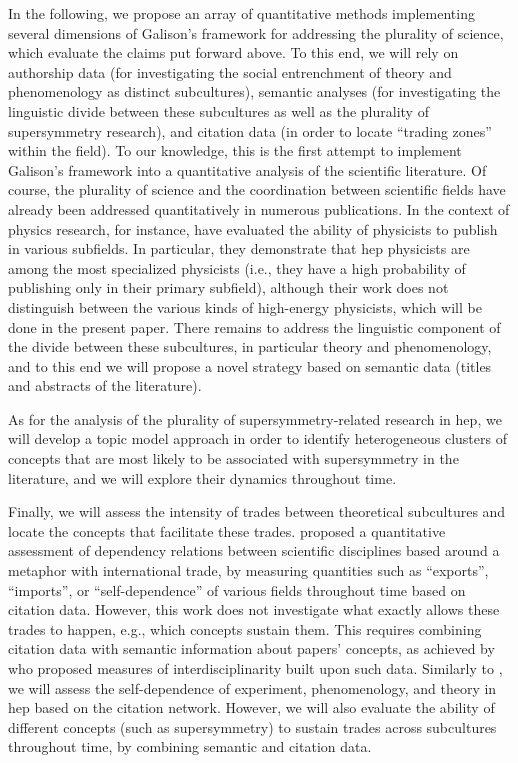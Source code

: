 \documentclass[smallextended]{svjour3}
\begin{document}
In the following, we propose an array of quantitative methods implementing several dimensions of Galison's framework for addressing the plurality of science, which evaluate the claims put forward above. To this end, we will rely on authorship data (for investigating the social entrenchment of theory and phenomenology as distinct subcultures), semantic analyses (for investigating the linguistic divide between these subcultures as well as the plurality of supersymmetry research), and citation data (in order to locate ``trading zones'' within the field). To our knowledge, this is the first attempt to implement Galison's framework into a quantitative analysis of the scientific literature. Of course, the plurality of science and the coordination between scientific fields have already been addressed quantitatively in numerous publications. In the context of physics research, for instance, \citet{Battiston2019} have evaluated the ability of physicists to publish in various subfields. In particular, they demonstrate that \gls{hep} physicists are among the most specialized physicists (i.e., they have a high probability of publishing only in their primary subfield), although their work does not distinguish between the various kinds of high-energy physicists, which will be done in the present paper. There remains to address the linguistic component of the divide between these subcultures, in particular theory and phenomenology, and to this end we will propose a novel strategy based on semantic data (titles and abstracts of the literature).

As for the analysis of the plurality of supersymmetry-related research in \gls{hep}, we will develop a topic model approach in order to identify heterogeneous clusters of concepts that are most likely to be associated with supersymmetry in the literature, and we will explore their dynamics throughout time.

Finally, we will assess the intensity of trades between theoretical subcultures and locate the concepts that facilitate these trades. \citet{Yan2013} proposed a quantitative assessment of dependency relations between scientific disciplines based around a metaphor with international trade, by measuring quantities such as ``exports'', ``imports'', or ``self-dependence'' of various fields throughout time based on citation data. However, this work does not investigate what exactly allows these trades to happen, e.g., which concepts sustain them. This requires combining citation data with semantic information about papers' concepts, as achieved by \citet{Raimbault2019} who proposed measures of interdisciplinarity built upon such data. Similarly to \citealt{Yan2013}, we will assess the self-dependence of experiment, phenomenology, and theory in \gls{hep} based on the citation network. However, we will also evaluate the ability of different concepts (such as supersymmetry) to sustain trades across subcultures throughout time, by combining semantic and citation data.
\end{document}
